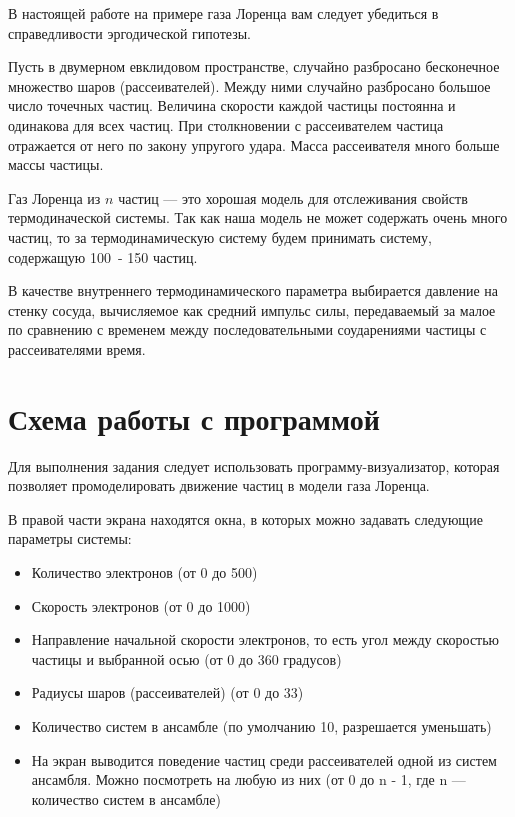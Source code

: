 \documentclass[12pt,a4paper]{scrartcl}
\begin{document}
	В настоящей работе на примере газа Лоренца вам следует убедиться в справедливости эргодической гипотезы.
	
	Пусть в двумерном евклидовом пространстве, случайно разбросано бесконечное множество шаров (рассеивателей). Между ними случайно разбросано большое число точечных частиц. Величина скорости каждой частицы постоянна и одинакова для всех частиц. При столкновении с рассеивателем частица отражается от него по закону упругого удара. Масса рассеивателя много больше массы частицы. 
	
	Газ Лоренца из $n$ частиц --- это хорошая модель для отслеживания свойств термодиначеской системы. Так как наша модель не может содержать очень много частиц, то за термодинамическую систему будем принимать систему, содержащую 100\ - 150 частиц.
	
	В качестве внутреннего термодинамического параметра выбирается давление на стенку сосуда, вычисляемое как средний импульс силы, передаваемый за малое по сравнению с временем между последовательными соударениями частицы с рассеивателями время.
    
\section{Схема работы с программой}
        
        Для выполнения задания следует использовать программу-визуализатор, которая позволяет промоделировать движение частиц в модели газа Лоренца.

    В правой части экрана находятся окна, в которых можно задавать следующие параметры системы:

    \begin{itemize}
    	\item Количество электронов (от 0 до 500)
        \item Скорость электронов (от 0 до 1000)
        \item Направление начальной скорости электронов, то есть угол между скоростью частицы и выбранной осью (от 0 до 360 градусов)
        \item Радиусы шаров (рассеивателей) (от 0 до 33)
        \item Количество систем в ансамбле (по умолчанию 10, разрешается уменьшать)
		\item На экран выводится поведение частиц среди рассеивателей одной из систем ансамбля. Можно посмотреть на любую из них (от 0 до n - 1, где n --- количество систем в ансамбле)
    \end{itemize}
\end{document}
